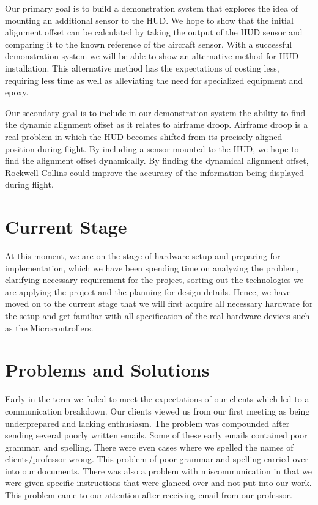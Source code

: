\documentclass[letterpaper,10pt,onecolumn]{IEEEtran}
\begin{document}
Our primary goal is to build a demonstration system that explores the idea of mounting an additional sensor to the HUD. We hope to show that the initial alignment offset can be calculated by taking the output of the HUD sensor and comparing it to the known reference of the aircraft sensor. With a successful demonstration system we will be able to show an alternative method for HUD installation. This alternative method has the expectations of costing less, requiring less time as well as alleviating the need for specialized equipment and epoxy.

Our secondary goal is to include in our demonstration system the ability to find the dynamic alignment offset as it relates to airframe droop. Airframe droop is a real problem in which the HUD becomes shifted from its precisely aligned position during flight. By including a sensor mounted to the HUD, we hope to find the alignment offset dynamically. By finding the dynamical alignment offset, Rockwell Collins could improve the accuracy of the information being displayed during flight.

\section{Current Stage}
At this moment, we are on the stage of hardware setup and preparing for implementation, which we have been spending time on analyzing the problem, clarifying necessary requirement for the project, sorting out the technologies we are applying the project and the planning for design details. Hence, we have moved on to the current stage that we will first acquire all necessary hardware for the setup and get familiar with all specification of the real hardware devices such as the Microcontrollers.

\section{Problems and Solutions}
Early in the term we failed to meet the expectations of our clients which led to a communication breakdown. Our clients viewed us from our first meeting as being underprepared and lacking enthusiasm. The problem was compounded after sending several poorly written emails. Some of these early emails contained poor grammar, and spelling. There were even cases where we spelled the names of clients/professor wrong. This problem of poor grammar and spelling carried over into our documents. There was also a problem with miscommunication in that we were given specific instructions that were glanced over and not put into our work. This problem came to our attention after receiving email from our professor.
\end{document}
